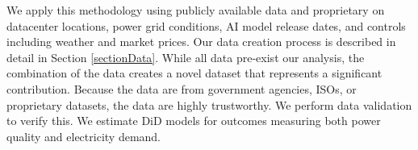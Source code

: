 \documentclass[a4paper,fleqn,longmktitle]{cas-sc}
\newcommand{\nb}[1]{\textcolor{blue}{NB[#1]}}
\theoremstyle{plain}
\theoremstyle{definition}
\begin{document}



We apply this methodology using publicly available data and proprietary on datacenter locations, power grid conditions, AI model release dates, and controls including weather and market prices. Our data creation process is described in detail in Section \ref{sectionData}. While all data pre-exist our analysis, the combination of the data creates a novel dataset that represents a significant contribution. Because the data are from government agencies, ISOs, or proprietary datasets, the data are highly trustworthy. We perform data validation to verify this. We estimate DiD models for outcomes measuring both power quality and electricity demand.
\end{document}
